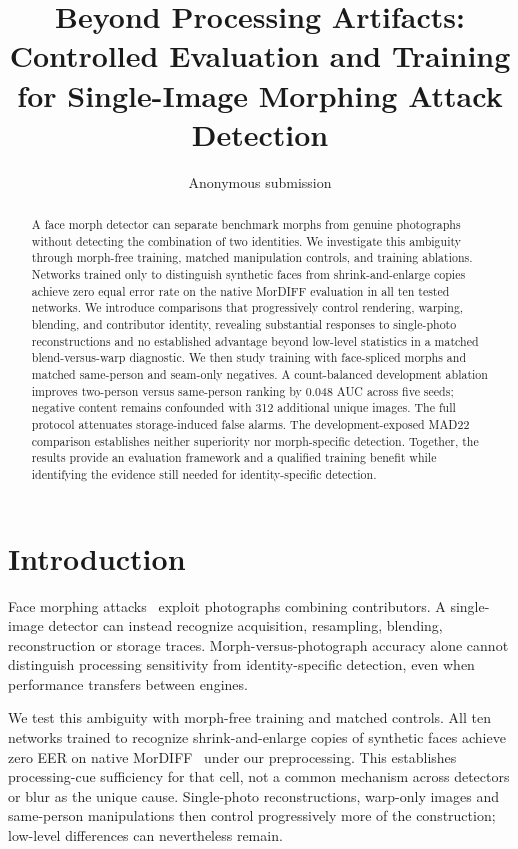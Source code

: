 \documentclass[10pt,twocolumn,letterpaper]{article}
\title{Beyond Processing Artifacts: Controlled Evaluation and Training\\for Single-Image Morphing Attack Detection}
\author{Anonymous submission}
\begin{document}
\maketitle
\begin{abstract}
A face morph detector can separate benchmark morphs from genuine photographs without detecting the combination of two identities. We investigate this ambiguity through morph-free training, matched manipulation controls, and training ablations. Networks trained only to distinguish synthetic faces from shrink-and-enlarge copies achieve zero equal error rate on the native MorDIFF evaluation in all ten tested networks. We introduce comparisons that progressively control rendering, warping, blending, and contributor identity, revealing substantial responses to single-photo reconstructions and no established advantage beyond low-level statistics in a matched blend-versus-warp diagnostic. We then study training with face-spliced morphs and matched same-person and seam-only negatives. A count-balanced development ablation improves two-person versus same-person ranking by 0.048 AUC across five seeds; negative content remains confounded with 312 additional unique images. The full protocol attenuates storage-induced false alarms. The development-exposed MAD22 comparison establishes neither superiority nor morph-specific detection. Together, the results provide an evaluation framework and a qualified training benefit while identifying the evidence still needed for identity-specific detection.
\end{abstract}

\section{Introduction}
Face morphing attacks~\cite{ferrara2014magic} exploit photographs combining contributors. A single-image detector can instead recognize acquisition, resampling, blending, reconstruction or storage traces. Morph-versus-photograph accuracy alone cannot distinguish processing sensitivity from identity-specific detection, even when performance transfers between engines.

We test this ambiguity with morph-free training and matched controls. All ten networks trained to recognize shrink-and-enlarge copies of synthetic faces achieve zero EER on native MorDIFF~\cite{damer2023mordiff} under our preprocessing. This establishes processing-cue sufficiency for that cell, not a common mechanism across detectors or blur as the unique cause. Single-photo reconstructions, warp-only images and same-person manipulations then control progressively more of the construction; low-level differences can nevertheless remain.
\end{document}
